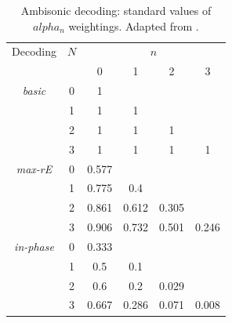 \begin{table}[t]
\caption{Ambisonic decoding: standard values of $alpha_n$ weightings. Adapted from \cite{daniel2000representation}.}
\begin{center}
\begin{tabular}{cccccc}
\toprule
Decoding & $N$ & \multicolumn{4}{c}{$n$} \\ 
&  & 0 & 1 & 2 & 3 \\
\midrule
\textit{basic} & 0 & 1  \\
	& 1 & 1 & 1  \\
 	& 2 & 1 & 1 & 1 \\
 	& 3 & 1 & 1 & 1 & 1 \\
\midrule
\textit{max-rE} & 0 & 0.577  \\
	& 1 & 0.775 & 0.4  \\
 	& 2 & 0.861 & 0.612 & 0.305 \\
 	& 3 & 0.906 & 0.732 & 0.501 & 0.246 \\
\midrule
\textit{in-phase} & 0 & 0.333  \\
	& 1 & 0.5 & 0.1  \\
 	& 2 & 0.6 & 0.2 & 0.029 \\
 	& 3 & 0.667 & 0.286 & 0.071 & 0.008 \\
\bottomrule
\end{tabular}
\label{tab:alpha}
\end{center}
\end{table}


